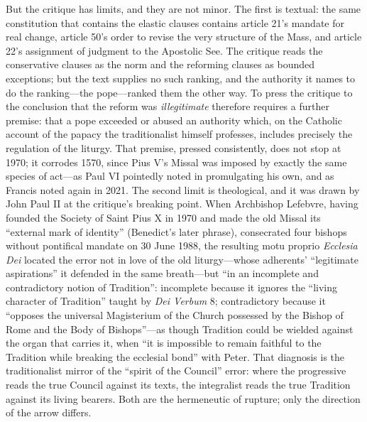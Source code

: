 But the critique has limits, and they are not minor. The first is textual: the same constitution that contains the elastic clauses contains article 21's mandate for real change, article 50's order to revise the very structure of the Mass, and article 22's assignment of judgment to the Apostolic See. The critique reads the conservative clauses as the norm and the reforming clauses as bounded exceptions; but the text supplies no such ranking, and the authority it names to do the ranking---the pope---ranked them the other way. To press the critique to the conclusion that the reform was \emph{illegitimate} therefore requires a further premise: that a pope exceeded or abused an authority which, on the Catholic account of the papacy the traditionalist himself professes, includes precisely the regulation of the liturgy. That premise, pressed consistently, does not stop at 1970; it corrodes 1570, since Pius V's Missal was imposed by exactly the same species of act---as Paul VI pointedly noted in promulgating his own, and as Francis noted again in 2021. The second limit is theological, and it was drawn by John Paul II at the critique's breaking point. When Archbishop Lefebvre, having founded the Society of Saint Pius X in 1970 and made the old Missal its ``external mark of identity'' (Benedict's later phrase), consecrated four bishops without pontifical mandate on 30 June 1988, the resulting motu proprio \emph{Ecclesia Dei} located the error not in love of the old liturgy---whose adherents' ``legitimate aspirations'' it defended in the same breath---but ``in an incomplete and contradictory notion of Tradition'': incomplete because it ignores the ``living character of Tradition'' taught by \emph{Dei Verbum} 8; contradictory because it ``opposes the universal Magisterium of the Church possessed by the Bishop of Rome and the Body of Bishops''---as though Tradition could be wielded against the organ that carries it, when ``it is impossible to remain faithful to the Tradition while breaking the ecclesial bond'' with Peter. That diagnosis is the traditionalist mirror of the ``spirit of the Council'' error: where the progressive reads the true Council against its texts, the integralist reads the true Tradition against its living bearers. Both are the hermeneutic of rupture; only the direction of the arrow differs.

